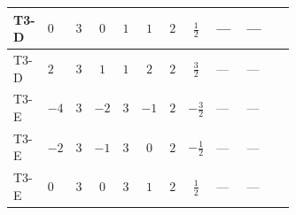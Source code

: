 \documentclass[8pt]{article}
\begin{document}
\begin{landscape}
\begin{longtable}{@{}llcccccc >{\raggedright\arraybackslash}p{0.21\linewidth} >{\raggedright\arraybackslash}p{0.21\linewidth} >{\raggedright\arraybackslash}p{0.21\linewidth}@{}}
\midrule
T3-D & $0$ & $3$ & $0$ & $1$ & $1$ & $2$ & $\frac{1}{2}$ & --- & --- & \scriptsize\adjustbox{max width=\linewidth}{$\begin{gathered} {\lambda_{HS_1}^{(A)}} (2 T_{\nu}^{(1)}+6 \operatorname{Tr}\!\left({Y_d}\,\left({Y_d}\right)^{\dagger}\right)+2 \operatorname{Tr}\!\left({Y_e}\,\left({Y_e}\right)^{\dagger}\right)+6 \operatorname{Tr}\!\left({Y_u}\,\left({Y_u}\right)^{\dagger}\right)+16 {\lambda_{S_1}^{(A)}})\end{gathered}$} \\
\midrule
T3-D & $2$ & $3$ & $1$ & $1$ & $2$ & $2$ & $\frac{3}{2}$ & --- & --- & \scriptsize\adjustbox{max width=\linewidth}{$\begin{gathered} {\lambda_{HS_1}^{(A)}} (2 T_{\nu}^{(1)}+6 \operatorname{Tr}\!\left({Y_d}\,\left({Y_d}\right)^{\dagger}\right)+2 \operatorname{Tr}\!\left({Y_e}\,\left({Y_e}\right)^{\dagger}\right)+6 \operatorname{Tr}\!\left({Y_u}\,\left({Y_u}\right)^{\dagger}\right)+16 {\lambda_{S_1}^{(A)}})\end{gathered}$} \\
\midrule
T3-E & $-4$ & $3$ & $-2$ & $3$ & $-1$ & $2$ & $-\frac{3}{2}$ & --- & --- & \scriptsize\adjustbox{max width=\linewidth}{$\begin{gathered} {\lambda_{HS_1}^{(A)}} (2 T_{\nu}^{(1)}+6 \operatorname{Tr}\!\left({Y_d}\,\left({Y_d}\right)^{\dagger}\right)+2 \operatorname{Tr}\!\left({Y_e}\,\left({Y_e}\right)^{\dagger}\right)+6 \operatorname{Tr}\!\left({Y_u}\,\left({Y_u}\right)^{\dagger}\right)+16 {\lambda_{S_1}^{(A)}})\end{gathered}$} \\
\midrule
T3-E & $-2$ & $3$ & $-1$ & $3$ & $0$ & $2$ & $-\frac{1}{2}$ & --- & --- & \scriptsize\adjustbox{max width=\linewidth}{$\begin{gathered} {\lambda_{HS_1}^{(A)}} (2 T_{\nu}^{(1)}+6 \operatorname{Tr}\!\left({Y_d}\,\left({Y_d}\right)^{\dagger}\right)+2 \operatorname{Tr}\!\left({Y_e}\,\left({Y_e}\right)^{\dagger}\right)+6 \operatorname{Tr}\!\left({Y_u}\,\left({Y_u}\right)^{\dagger}\right)+16 {\lambda_{S_1}^{(A)}})\end{gathered}$} \\
\midrule
T3-E & $0$ & $3$ & $0$ & $3$ & $1$ & $2$ & $\frac{1}{2}$ & --- & --- & \scriptsize\adjustbox{max width=\linewidth}{$\begin{gathered} {\lambda_{HS_1}^{(A)}} (2 T_{\nu}^{(1)}+6 \operatorname{Tr}\!\left({Y_d}\,\left({Y_d}\right)^{\dagger}\right)+2 \operatorname{Tr}\!\left({Y_e}\,\left({Y_e}\right)^{\dagger}\right)+6 \operatorname{Tr}\!\left({Y_u}\,\left({Y_u}\right)^{\dagger}\right)+16 {\lambda_{S_1}^{(A)}})\end{gathered}$} \\

\end{longtable}
\end{landscape}
\end{document}
